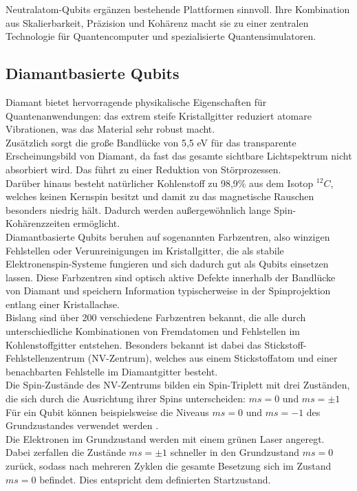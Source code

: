 Neutralatom-Qubits ergänzen bestehende Plattformen sinnvoll. Ihre Kombination aus Skalierbarkeit, Präzision und Kohärenz macht sie zu einer zentralen Technologie für Quantencomputer und spezialisierte Quantensimulatoren.





\subsection{Diamantbasierte Qubits}
\label{subsec: Diamantbasierte Qubits}

Diamant bietet hervorragende physikalische Eigenschaften für Quantenanwendungen: das extrem steife Kristallgitter reduziert atomare Vibrationen, was das Material sehr robust macht. \\
Zusätzlich sorgt die große Bandlücke von 5,5 eV für das transparente Erscheinungsbild von Diamant, da fast das gesamte sichtbare Lichtspektrum nicht absorbiert wird. Das führt zu einer Reduktion von Störprozessen. \\
Darüber hinaus besteht natürlicher Kohlenstoff zu 98,9\% aus dem Isotop ${}^{12}C$, welches keinen Kernspin besitzt und damit zu das magnetische Rauschen besonders niedrig hält. Dadurch werden außergewöhnlich lange Spin-Kohärenzzeiten ermöglicht. \\

Diamantbasierte Qubits beruhen auf sogenannten Farbzentren, also winzigen Fehlstellen oder Verunreinigungen im Kristallgitter, die als stabile Elektronenspin-Systeme fungieren und sich dadurch gut als Qubits einsetzen lassen. Diese Farbzentren sind optisch aktive Defekte innerhalb der Bandlücke von Diamant und speichern Information typischerweise in der Spinprojektion entlang einer Kristallachse. \\

Bislang sind über 200 verschiedene Farbzentren bekannt, die alle durch unterschiedliche Kombinationen von Fremdatomen und Fehlstellen im Kohlenstoffgitter entstehen. Besonders bekannt ist dabei das Stickstoff-Fehlstellenzentrum (NV-Zentrum), welches aus einem Stickstoffatom und einer benachbarten Fehlstelle im Diamantgitter besteht. \\

Die Spin-Zustände des NV-Zentrums bilden ein Spin-Triplett mit drei Zuständen, die sich durch die Ausrichtung ihrer Spins unterscheiden: $ms = 0$ und $ms = \pm 1$
Für ein Qubit können beispielsweise die Niveaus $ms = 0$ und $ms = -1$ des Grundzustandes verwendet werden . \\
Die Elektronen im Grundzustand werden mit einem grünen Laser angeregt. Dabei zerfallen die Zustände $ms = \pm 1$ schneller in den Grundzustand $ms=0$ zurück, sodass nach mehreren Zyklen die gesamte Besetzung sich im Zustand $ms=0$ befindet. Dies entspricht dem definierten Startzustand. \\

